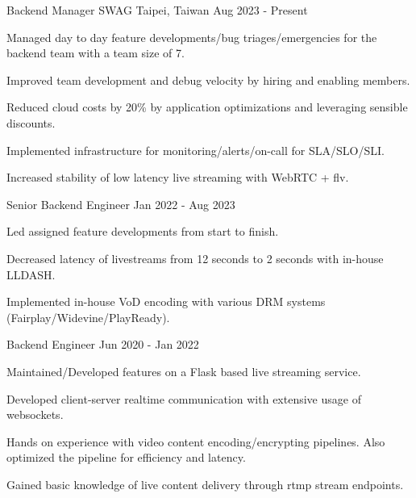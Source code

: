 

\begin{cventries}

  \cventry
    {Backend Manager} %
    {SWAG} %
    {Taipei, Taiwan} %
    {Aug 2023 - Present} %
    {
      \begin{cvitems} %
        \item {Managed day to day feature developments/bug triages/emergencies for the backend team with a team size of 7. }
        \item {Improved team development and debug velocity by hiring and enabling members. }
        \item {Reduced cloud costs by 20\% by application optimizations and leveraging sensible discounts. }
        \item {Implemented infrastructure for monitoring/alerts/on-call for SLA/SLO/SLI. }
        \item {Increased stability of low latency live streaming with WebRTC + flv. }
      \end{cvitems}
    }

  \cventry
    {Senior Backend Engineer} %
    {} %
    {} %
    {Jan 2022 - Aug 2023} %
    {
      \begin{cvitems} %
        \item {Led assigned feature developments from start to finish. }
        \item {Decreased latency of livestreams from 12 seconds to 2 seconds with in-house LLDASH. }
        \item {Implemented in-house VoD encoding with various DRM systems (Fairplay/Widevine/PlayReady). }
      \end{cvitems}
    }

  \cventry
    {Backend Engineer} %
    {} %
    {} %
    {Jun 2020 - Jan 2022} %
    {
      \begin{cvitems} %
        \item {Maintained/Developed features on a Flask based live streaming service. }
        \item {Developed client-server realtime communication with extensive usage of websockets. }
        \item {Hands on experience with video content encoding/encrypting pipelines. Also optimized the pipeline for efficiency and latency. }
        \item {Gained basic knowledge of live content delivery through rtmp stream endpoints.}
      \end{cvitems}
    }


\end{cventries}
